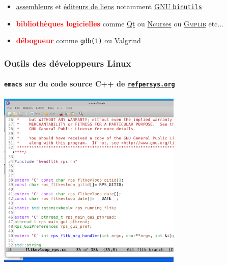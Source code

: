 \documentclass[xcolor=svgnames,final,smaller,a4]{beamer}
\begin{document}
\begin{frame}
\begin{relsize}{-1}
\begin{itemize}
    
    \item \href{https://fr.wikipedia.org/wiki/Programme_assembleur}{assembleurs} et \href{https://fr.wikipedia.org/wiki/Édition_de_liens}{éditeurs de liens} notamment \href{https://fr.wikipedia.org/wiki/GNU\_Binutils}{GNU \texttt{binutils}} 
    
    \item \textbf{\textcolor{red}{bibliothèques logicielles}} comme
      \href{https://qt.io}{Qt} ou
      \href{https://fr.wikipedia.org/wiki/Ncurses}{Ncurses} ou
      \href{http://gmplib.org/}{\textsc{Gmplib}} etc...
      
    \item  \textbf{\textcolor{red}{débogueur}} comme 
    \href{https://man7.org/linux/man-pages/man1/gdb.1.html}{\texttt{gdb(1)}} ou \href{https://fr.wikipedia.org/wiki/Valgrind}{Valgrind}
      
  \end{itemize}
  \end{relsize}
\end{frame}

\begin{frame}
  \frametitle{Outils des développeurs Linux}
  \framesubtitle{\texttt{emacs} sur du code source C++ de \href{http://refpersys.org/}{\texttt{refpersys.org}}}

  \vspace{0.1cm}
  
    \includegraphics[width=0.66\textwidth]{emacs-refpersys} 
\end{frame}
\end{document}
